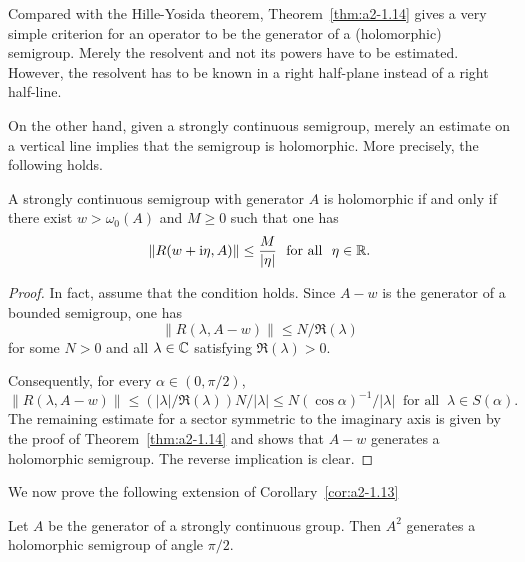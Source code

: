 Compared with the Hille-Yosida theorem, Theorem~\ref{thm:a2-1.14}   gives a very simple criterion for an operator to be the generator of a (holomorphic) semigroup.
Merely the resolvent and not its powers have to be
estimated.
However, the resolvent has to be known in a right half-plane instead of a right half-line.

On the other hand, given a strongly continuous semigroup, merely an estimate on a vertical line implies that the semigroup is holomorphic.
More precisely, the following holds.
\begin{corollary*}\label{cor:a2-1.14-kgk}
A strongly continuous semigroup with generator $A$ is holomorphic if and only if there exist $w > \omega_{0}(A)$ and $M \geq 0$ such that one has
\[
    \|R(w+\im\eta,A)\| \leq \frac{M}{|\eta|}  \ \text{ for all }\ \eta \in \R.
\]
\end{corollary*}
\begin{proof}
In fact, assume that the condition holds.
Since $A-w$ is the generator of a bounded semigroup, one has 
%
\[
	\|R(\lambda,A-w)\| \leq N/\Re(\lambda)
\]
%
for some $N > 0$ and all $\lambda \in \mathbb{C}$ satisfying $\Re(\lambda) > 0$.

Consequently, for every $\alpha \in (0,\pi/2)$, 
\[
\|R(\lambda,A-w)\| \leq (|\lambda|/\Re(\lambda))N/|\lambda| \leq N(\cos\alpha)^{-1}/|\lambda| 
 \ \text{ for all }\ \lambda \in S(\alpha) .
\]
The remaining estimate for a sector symmetric to the imaginary axis is given by the proof of Theorem~\ref{thm:a2-1.14} and shows that $A-w$ generates a holomorphic semigroup.
The reverse implication is clear.
\end{proof}
We now prove the following extension of Corollary~\ref{cor:a2-1.13}  
\begin{theorem}\label{thm:a2-1.15}
Let $A$ be the generator of a strongly continuous group.
Then $A^2$ generates a holomorphic semigroup of angle $\pi/2$.
\end{theorem}

